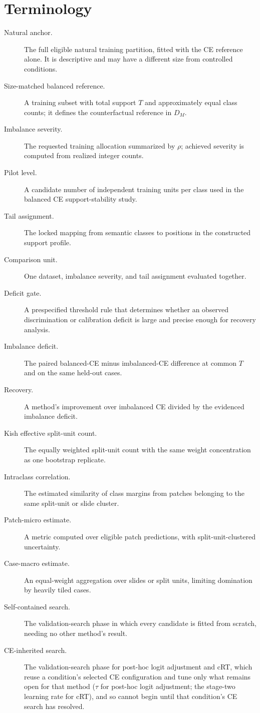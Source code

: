 \documentclass[11pt]{article}
\begin{document}
\section{Terminology}
\label{app:terms}
\begin{description}
  \item[Natural anchor.] The full eligible natural training partition, fitted with the CE reference alone. It is descriptive and may have a different size from controlled conditions.
  \item[Size-matched balanced reference.] A training subset with total support $T$ and approximately equal class counts; it defines the counterfactual reference in $D_M$.
  \item[Imbalance severity.] The requested training allocation summarized by $\rho$; achieved severity is computed from realized integer counts.
  \item[Pilot level.] A candidate number of independent training units per class used in the balanced CE support-stability study.
  \item[Tail assignment.] The locked mapping from semantic classes to positions in the constructed support profile.
  \item[Comparison unit.] One dataset, imbalance severity, and tail assignment evaluated together.
  \item[Deficit gate.] A prespecified threshold rule that determines whether an observed discrimination or calibration deficit is large and precise enough for recovery analysis.
  \item[Imbalance deficit.] The paired balanced-CE minus imbalanced-CE difference at common $T$ and on the same held-out cases.
  \item[Recovery.] A method's improvement over imbalanced CE divided by the evidenced imbalance deficit.
  \item[Kish effective split-unit count.] The equally weighted split-unit count with the same weight concentration as one bootstrap replicate.
  \item[Intraclass correlation.] The estimated similarity of class margins from patches belonging to the same split-unit or slide cluster.
  \item[Patch-micro estimate.] A metric computed over eligible patch predictions, with split-unit-clustered uncertainty.
  \item[Case-macro estimate.] An equal-weight aggregation over slides or split units, limiting domination by heavily tiled cases.
  \item[Self-contained search.] The validation-search phase in which every candidate is fitted from scratch, needing no other method's result.
  \item[CE-inherited search.] The validation-search phase for post-hoc logit adjustment and cRT, which reuse a condition's selected CE configuration and tune only what remains open for that method ($\tau$ for post-hoc logit adjustment; the stage-two learning rate for cRT), and so cannot begin until that condition's CE search has resolved.
\end{description}

\clearpage


\end{document}
